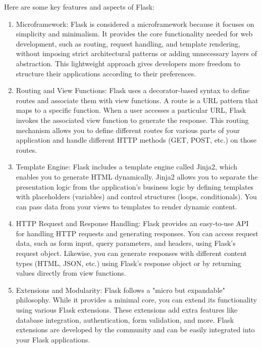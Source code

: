 \documentclass[12 pt, oneside]{book}
\begin{document}
Here are some key features and aspects of Flask:
\begin{enumerate}
  
\item  Microframework: Flask is considered a microframework because it focuses on simplicity and minimalism. It provides the core functionality needed for web development, such as routing, request handling, and template rendering, without imposing strict architectural patterns or adding unnecessary layers of abstraction. This lightweight approach gives developers more freedom to structure their applications according to their preferences.

\item  Routing and View Functions: Flask uses a decorator-based syntax to define routes and associate them with view functions. A route is a URL pattern that maps to a specific function. When a user accesses a particular URL, Flask invokes the associated view function to generate the response. This routing mechanism allows you to define different routes for various parts of your application and handle different HTTP methods (GET, POST, etc.) on those routes.

\item Template Engine: Flask includes a template engine called Jinja2, which enables you to generate HTML dynamically. Jinja2 allows you to separate the presentation logic from the application's business logic by defining templates with placeholders (variables) and control structures (loops, conditionals). You can pass data from your views to templates to render dynamic content.

\item  HTTP Request and Response Handling: Flask provides an easy-to-use API for handling HTTP requests and generating responses. You can access request data, such as form input, query parameters, and headers, using Flask's request object. Likewise, you can generate responses with different content types (HTML, JSON, etc.) using Flask's response object or by returning values directly from view functions.

\item  Extensions and Modularity: Flask follows a "micro but expandable" philosophy. While it provides a minimal core, you can extend its functionality using various Flask extensions. These extensions add extra features like database integration, authentication, form validation, and more. Flask extensions are developed by the community and can be easily integrated into your Flask applications.


\end{enumerate}
\end{document}
